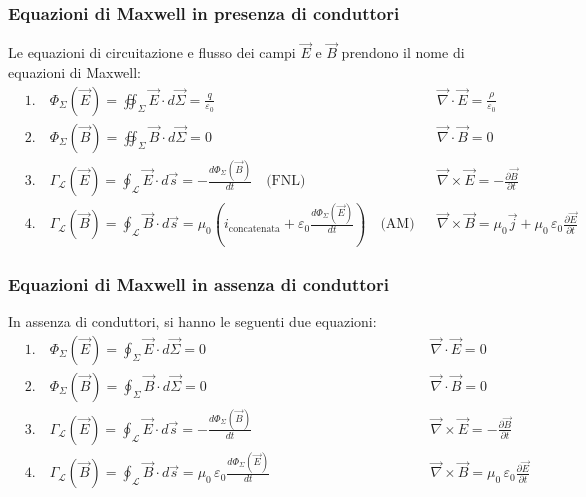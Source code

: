 \documentclass[a4paper]{article}
\newcommand\nab{\vec{\nabla}} %
\begin{document}
\subsubsection*{Equazioni di Maxwell in presenza di conduttori}
Le equazioni di circuitazione e flusso dei campi \(\vec{E}\) e \(\vec{B}\) prendono il nome di equazioni di Maxwell:
\begin{align*}
	&1. \quad \Phi_\Sigma(\vec{E}) = \oiint_\Sigma \vec{E} \cdot d\vec{\Sigma} = \frac{q}{\varepsilon_0} 
	&& \nab \cdot \vec{E} = \frac{\rho}{\varepsilon_0} \\
	&2. \quad \Phi_\Sigma(\vec{B}) = \oiint_\Sigma \vec{B} \cdot d \vec{\Sigma} = 0 
	&& \nab \cdot \vec{B} = 0 \\
	&3. \quad \Gamma_\mathcal{L}(\vec{E}) = \oint_\mathcal{L} \vec{E} \cdot d\vec{s} = - \frac{d\Phi_\Sigma (\vec{B})}{dt} \quad \text{(FNL)}
	&& \nab \times \vec{E} = - \frac{\partial \vec{B}}{\partial t} \\
	&4. \quad \Gamma_\mathcal{L}(\vec{B}) = \oint_\mathcal{L} \vec{B} \cdot d\vec{s} = \mu_0 (i_\text{concatenata} + \varepsilon_0 \frac{d \Phi_\Sigma (\vec{E})}{dt}) \quad \text{(AM)}
	&& \nab \times \vec{B} = \mu_0 \vec{j} + \mu_0 \, \varepsilon_0 \frac{\partial \vec{E}}{\partial t}
\end{align*}

\subsubsection*{Equazioni di Maxwell in assenza di conduttori}
In assenza di conduttori, si hanno le seguenti due equazioni:
\begin{align*}
	&1. \quad \Phi_\Sigma(\vec{E}) = \oint_\Sigma \vec{E} \cdot d\vec{\Sigma} = 0
	&& \nab \cdot \vec{E} = 0\\
	&2. \quad \Phi_\Sigma(\vec{B}) = \oint_\Sigma \vec{B} \cdot d \vec{\Sigma} = 0 
	&& \nab \cdot \vec{B} = 0 \\
	&3. \quad \Gamma_\mathcal{L}(\vec{E}) = \oint_\mathcal{L} \vec{E} \cdot d\vec{s} = - \frac{d\Phi_\Sigma (\vec{B})}{dt}
	&& \nab \times \vec{E} = - \frac{\partial \vec{B}}{\partial t} \\
	&4. \quad \Gamma_\mathcal{L}(\vec{B}) = \oint_\mathcal{L} \vec{B} \cdot d\vec{s} = \mu_0 \, \varepsilon_0 \frac{d \Phi_\Sigma (\vec{E})}{dt} \qquad\qquad\qquad\qquad\quad\;\;\;
	&& \nab \times \vec{B} = \mu_0 \, \varepsilon_0 \frac{\partial \vec{E}}{\partial t} \qquad\;\;\;
\end{align*}
\end{document}
